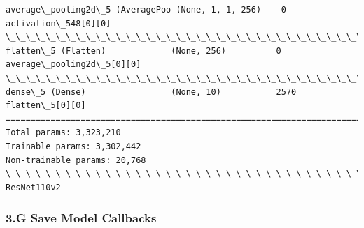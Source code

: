 \documentclass[11pt]{article}
\begin{document}
\begin{Verbatim}[commandchars=\\\{\}]
average\_pooling2d\_5 (AveragePoo (None, 1, 1, 256)    0           activation\_548[0][0]             
\_\_\_\_\_\_\_\_\_\_\_\_\_\_\_\_\_\_\_\_\_\_\_\_\_\_\_\_\_\_\_\_\_\_\_\_\_\_\_\_\_\_\_\_\_\_\_\_\_\_\_\_\_\_\_\_\_\_\_\_\_\_\_\_\_\_\_\_\_\_\_\_\_\_\_\_\_\_\_\_\_\_\_\_\_\_\_\_\_\_\_\_\_\_\_\_\_\_
flatten\_5 (Flatten)             (None, 256)          0           average\_pooling2d\_5[0][0]        
\_\_\_\_\_\_\_\_\_\_\_\_\_\_\_\_\_\_\_\_\_\_\_\_\_\_\_\_\_\_\_\_\_\_\_\_\_\_\_\_\_\_\_\_\_\_\_\_\_\_\_\_\_\_\_\_\_\_\_\_\_\_\_\_\_\_\_\_\_\_\_\_\_\_\_\_\_\_\_\_\_\_\_\_\_\_\_\_\_\_\_\_\_\_\_\_\_\_
dense\_5 (Dense)                 (None, 10)           2570        flatten\_5[0][0]                  
==================================================================================================
Total params: 3,323,210
Trainable params: 3,302,442
Non-trainable params: 20,768
\_\_\_\_\_\_\_\_\_\_\_\_\_\_\_\_\_\_\_\_\_\_\_\_\_\_\_\_\_\_\_\_\_\_\_\_\_\_\_\_\_\_\_\_\_\_\_\_\_\_\_\_\_\_\_\_\_\_\_\_\_\_\_\_\_\_\_\_\_\_\_\_\_\_\_\_\_\_\_\_\_\_\_\_\_\_\_\_\_\_\_\_\_\_\_\_\_\_
ResNet110v2

    \end{Verbatim}

    \hypertarget{g-save-model-callbacks}{%
\subsubsection{3.G Save Model Callbacks}\label{g-save-model-callbacks}}
\end{document}
